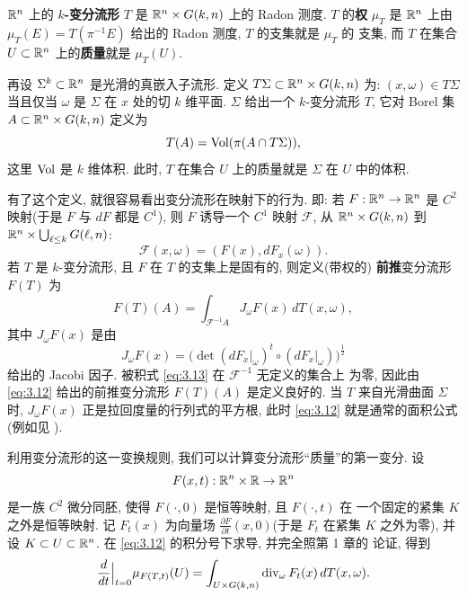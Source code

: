 \begin{definition}[变分流形]
\label{def:3.3}
$\mathbb{R}^n$ 上的 \textbf{$k$-变分流形} $T$ 是 $\mathbb{R}^n\times G(k,n)$ 上的
Radon 测度. $T$ 的\textbf{权} $\mu_T$ 是 $\mathbb{R}^n$ 上由
$\mu_T(E)=T(\pi^{-1}E)$ 给出的 Radon 测度, $T$ 的支集就是 $\mu_T$ 的
支集, 而 $T$ 在集合 $U\subset\mathbb{R}^n$ 上的\textbf{质量}就是 $\mu_T(U)$.
\end{definition}

再设 $\Sigma^k\subset\mathbb{R}^n$ 是光滑的真嵌入子流形. 定义
$T\Sigma\subset\mathbb{R}^n\times G(k,n)$ 为: $(x,\omega)\in T\Sigma$ 当且仅当
$\omega$ 是 $\Sigma$ 在 $x$ 处的切 $k$ 维平面. $\Sigma$ 给出一个
$k$-变分流形 $T$, 它对 Borel 集
$A\subset\mathbb{R}^n\times G(k,n)$ 定义为
\begin{equation}
T(A)=\operatorname{Vol}(\pi(A\cap T\Sigma)),
\label{eq:3.10}
\end{equation}
这里 $\operatorname{Vol}$ 是 $k$ 维体积. 此时, $T$ 在集合 $U$ 上的质量就是 $\Sigma$ 在
$U$ 中的体积.

有了这个定义, 就很容易看出变分流形在映射下的行为. 即: 若
$F:\mathbb{R}^n\to\mathbb{R}^n$ 是 $C^2$ 映射(于是 $F$ 与 $dF$ 都是 $C^1$), 则 $F$
诱导一个 $C^1$ 映射 $\mathcal{F}$, 从 $\mathbb{R}^n\times G(k,n)$ 到
$\mathbb{R}^n\times\bigcup_{\ell\leq k}G(\ell,n)$:
\begin{equation}
\mathcal{F}(x,\omega)=(F(x),dF_x(\omega)).
\label{eq:3.11}
\end{equation}
若 $T$ 是 $k$-变分流形, 且 $F$ 在 $T$ 的支集上是固有的, 则定义(带权的)
\textbf{前推}变分流形 $F(T)$ 为
\begin{equation}
F(T)(A)=\int_{\mathcal{F}^{-1}A}J_\omega F(x)\,dT(x,\omega),
\label{eq:3.12}
\end{equation}
其中 $J_\omega F(x)$ 是由
\begin{equation}
J_\omega F(x)=\bigl(\det(dF_x|_\omega)^t\circ(dF_x|_\omega)\bigr)^{\frac12}
\label{eq:3.13}
\end{equation}
给出的 Jacobi 因子. 被积式 \eqref{eq:3.13} 在 $\mathcal{F}^{-1}$ 无定义的集合上
为零, 因此由 \eqref{eq:3.12} 给出的前推变分流形 $F(T)(A)$ 是定义良好的. 当 $T$
来自光滑曲面 $\Sigma$ 时, $J_\omega F(x)$ 正是拉回度量的行列式的平方根,
此时 \eqref{eq:3.12} 就是通常的面积公式(例如见 \cite{Fe}).

利用变分流形的这一变换规则, 我们可以计算变分流形``质量''的第一变分.
设
\begin{equation}
F(x,t):\mathbb{R}^n\times\mathbb{R}\to\mathbb{R}^n
\label{eq:3.14}
\end{equation}
是一族 $C^2$ 微分同胚, 使得 $F(\cdot,0)$ 是恒等映射, 且 $F(\cdot,t)$ 在
一个固定的紧集 $K$ 之外是恒等映射. 记 $F_t(x)$ 为向量场
$\frac{\partial F}{\partial t}(x,0)$(于是 $F_t$ 在紧集 $K$ 之外为零), 并
设 $K\subset U\subset\mathbb{R}^n$. 在 \eqref{eq:3.12} 的积分号下求导, 并完全照第 1 章的
论证, 得到
\begin{equation}
\Bigl.\frac{d}{dt}\Bigr|_{t=0}\mu_{F(T,t)}(U)
 =\int_{U\times G(k,n)}\operatorname{div}_\omega F_t(x)\,dT(x,\omega).
\label{eq:3.15}
\end{equation}

